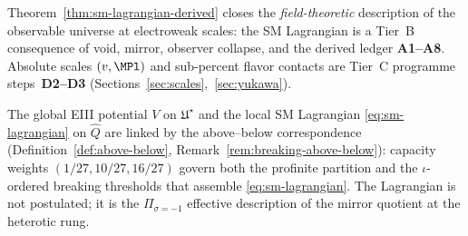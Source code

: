 \begin{corollary}
\label{cor:sm-lagrangian-closure}
Theorem~\ref{thm:sm-lagrangian-derived} closes the \emph{field-theoretic}
description of the observable universe at electroweak scales: the SM
Lagrangian is a Tier~B consequence of void, mirror, observer collapse, and the
derived ledger \textbf{A1--A8}. Absolute scales $(v,\MPl)$ and sub-percent
flavor contacts are Tier~C programme steps~\textbf{D2--D3}
(Sections~\ref{sec:scales},~\ref{sec:yukawa}).
\end{corollary}

\begin{remark}
The global EIII potential $V$ on $\mathfrak{U}^\star$ and the local SM
Lagrangian \eqref{eq:sm-lagrangian} on $\hat Q$ are linked by the
above--below correspondence (Definition~\ref{def:above-below},
Remark~\ref{rem:breaking-above-below}): capacity weights
$(1/27,10/27,16/27)$ govern both the profinite partition and the
$\iota$-ordered breaking thresholds that assemble \eqref{eq:sm-lagrangian}.
The Lagrangian is not postulated; it is the $\Pi_{\sigma=-1}$ effective
description of the mirror quotient at the heterotic rung.
\end{remark}